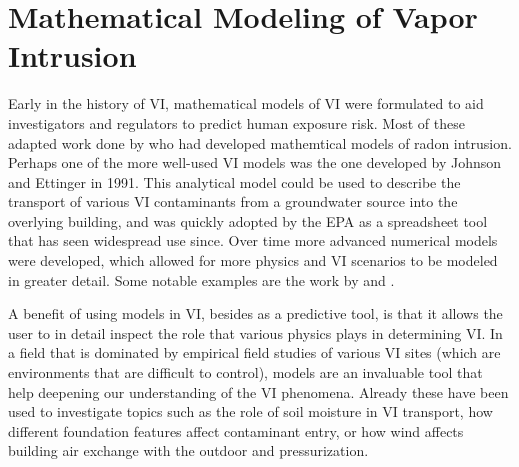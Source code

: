 \begin{comment}
Main point: Modeling is a useful tool for understanding the physical processes in VI.

- Mention some past use, advantages, and disadvantages. (Keep it brief and refer more to modeling chapter).
- Some examples again.

Mention in the end that we will use the model to investgiate some topics:
- Variability issue/ITS etc
- Mention sorption
\end{comment}


\section{Mathematical Modeling of Vapor Intrusion}

Early in the history of VI, mathematical models of VI were formulated to aid investigators and regulators to predict human exposure risk.
Most of these adapted work done by \citeauthor{nazaroff_predicting_1988}\cite{nazaroff_predicting_1988} who had developed mathemtical models of radon intrusion.
Perhaps one of the more well-used VI models was the one developed by Johnson and Ettinger in 1991\cite{johnson_heuristic_1991}.
This analytical model could be used to describe the transport of various VI contaminants from a groundwater source into the overlying building, and was quickly adopted by the EPA as a spreadsheet tool that has seen widespread use since\cite{u.s._environmental_protection_agency_oswer_2015}.
Over time more advanced numerical models were developed, which allowed for more physics and VI scenarios to be modeled in greater detail.
Some notable examples are the work by \citeauthor{abreu_effect_2005}\cite{abreu_effect_2005} and \citeauthor{pennell_development_2009}\cite{pennell_development_2009}.\par

A benefit of using models in VI, besides as a predictive tool, is that it allows the user to in detail inspect the role that various physics plays in determining VI.
In a field that is dominated by empirical field studies of various VI sites (which are environments that are difficult to control), models are an invaluable tool that help deepening our understanding of the VI phenomena.
Already these have been used to investigate topics such as the role of soil moisture in VI transport\cite{shen_influence_2013}, how different foundation features affect contaminant entry\cite{yao_simulating_2013}, or how wind affects building air exchange with the outdoor and pressurization\cite{shirazi_three-dimensional_2017}.\par

